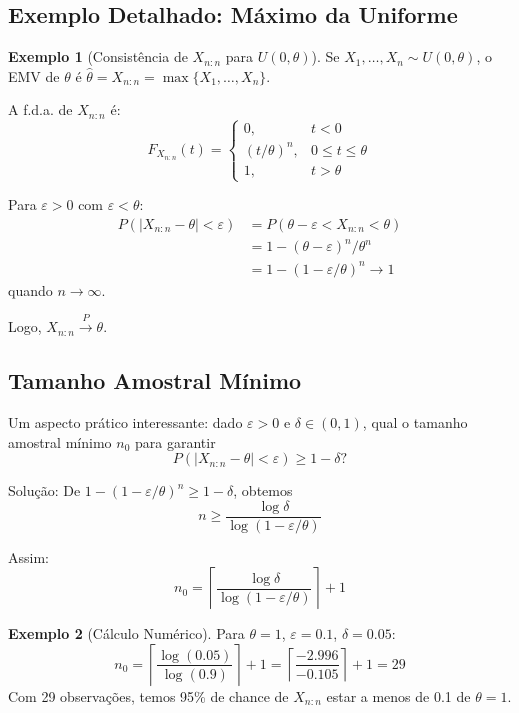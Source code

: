 \documentclass[12pt,a4paper]{article}
\theoremstyle{definition}
\newtheorem{exemplo}{Exemplo}[section]
\theoremstyle{plain}
\begin{document}
\subsection{Exemplo Detalhado: Máximo da Uniforme}

\begin{exemplo}[Consistência de $X_{n:n}$ para $U(0, \theta)$]
Se $X_1, \ldots, X_n \sim U(0, \theta)$, o EMV de $\theta$ é $\hat{\theta} = X_{n:n} = \max\{X_1, \ldots, X_n\}$.

A f.d.a. de $X_{n:n}$ é:
\[
F_{X_{n:n}}(t) = \begin{cases}
0, & t < 0 \\
(t/\theta)^n, & 0 \leq t \leq \theta \\
1, & t > \theta
\end{cases}
\]

Para $\varepsilon > 0$ com $\varepsilon < \theta$:
\begin{align}
P(|X_{n:n} - \theta| < \varepsilon) &= P(\theta - \varepsilon < X_{n:n} < \theta) \\
&= 1 - (\theta - \varepsilon)^n/\theta^n \\
&= 1 - (1 - \varepsilon/\theta)^n \to 1
\end{align}
quando $n \to \infty$.

Logo, $X_{n:n} \xrightarrow{P} \theta$.
\end{exemplo}

\subsection{Tamanho Amostral Mínimo}

Um aspecto prático interessante: dado $\varepsilon > 0$ e $\delta \in (0,1)$, qual o tamanho amostral mínimo $n_0$ para garantir
\[
P(|X_{n:n} - \theta| < \varepsilon) \geq 1 - \delta?
\]

Solução: De $1 - (1 - \varepsilon/\theta)^n \geq 1 - \delta$, obtemos
\[
n \geq \frac{\log \delta}{\log(1 - \varepsilon/\theta)}
\]

Assim:
\[
n_0 = \left\lceil \frac{\log \delta}{\log(1 - \varepsilon/\theta)} \right\rceil + 1
\]

\begin{exemplo}[Cálculo Numérico]
Para $\theta = 1$, $\varepsilon = 0.1$, $\delta = 0.05$:
\[
n_0 = \left\lceil \frac{\log(0.05)}{\log(0.9)} \right\rceil + 1 = \left\lceil \frac{-2.996}{-0.105} \right\rceil + 1 = 29
\]
Com 29 observações, temos 95\% de chance de $X_{n:n}$ estar a menos de 0.1 de $\theta = 1$.
\end{exemplo}
\end{document}

